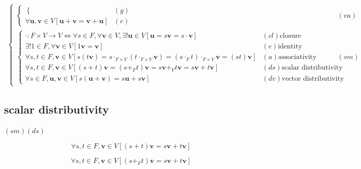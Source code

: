 \documentclass[
]{book}
\theoremstyle{definition}
\theoremstyle{definition}
\theoremstyle{definition}
\theoremstyle{definition}
\theoremstyle{remark}
\begin{document}
\[\begin{aligned}
\begin{cases}
\begin{cases}
\begin{cases}
\end{cases} & \left(g\right)\\
\forall\boldsymbol{u},\boldsymbol{v}\in V\left[\boldsymbol{u}+\boldsymbol{v}=\boldsymbol{v}+\boldsymbol{u}\right] & \left(c\right)
\end{cases} & \left(va\right)\\
\begin{cases}
\cdot:F\times V\overset{\cdot}{\rightarrow}V\Leftrightarrow\forall s\in F,\forall\boldsymbol{v}\in V,\exists!\boldsymbol{u}\in V\left[\boldsymbol{u}=s\boldsymbol{v}=s\cdot\boldsymbol{v}\right] & \left(cl\right)\text{closure}\\
\exists!1\in F,\forall\boldsymbol{v}\in V\left[1\boldsymbol{v}=\boldsymbol{v}\right] & \left(e\right)\text{identity}\\
\forall s,t\in F,\boldsymbol{v}\in V\left[s\left(t\boldsymbol{v}\right)=s\cdot_{{\scriptscriptstyle F\times V}}\left(t\cdot_{{\scriptscriptstyle F\times V}}\boldsymbol{v}\right)=\left(s\cdot_{{\scriptscriptstyle F}}t\right)\cdot_{{\scriptscriptstyle F\times V}}\boldsymbol{v}=\left(st\right)\boldsymbol{v}\right] & \left(a\right)\text{associativity}\\
\forall s,t\in F,\boldsymbol{v}\in V\left[\left(s+t\right)\boldsymbol{v}=\left(s+_{{\scriptscriptstyle F}}t\right)\boldsymbol{v}=s\boldsymbol{v}+_{{\scriptscriptstyle V}}t\boldsymbol{v}=s\boldsymbol{v}+t\boldsymbol{v}\right] & \left(ds\right)\text{scalar distributivity}\\
\forall s\in F,\boldsymbol{u},\boldsymbol{v}\in V\left[s\left(\boldsymbol{u}+\boldsymbol{v}\right)=s\boldsymbol{u}+s\boldsymbol{v}\right] & \left(dv\right)\text{vector distributivity}
\end{cases} & \left(sm\right)
\end{cases}
\end{aligned}
\]

\hypertarget{scalar-distributivity}{%
\subsection{scalar distributivity}\label{scalar-distributivity}}

\(\left(sm\right)\left(ds\right)\)

\[
\forall s,t\in F,\boldsymbol{v}\in V\left[\left(s+t\right)\boldsymbol{v}=s\boldsymbol{v}+t\boldsymbol{v}\right]
\]

\[
\forall s,t\in F,\boldsymbol{v}\in V\left[\left(s+_{{\scriptscriptstyle F}}t\right)\boldsymbol{v}=s\boldsymbol{v}+t\boldsymbol{v}\right]
\]
\end{document}

